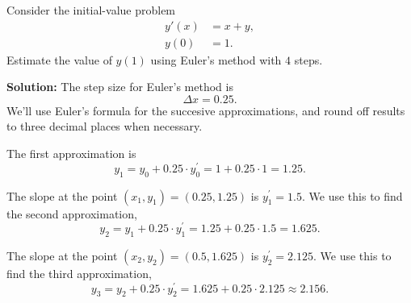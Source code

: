 \documentclass[11pt]{exam}
\begin{document}
\begin{questions}

\newpage
\addpoints
\question[4] Consider the initial-value problem
\begin{align*}
y'(x) & = x+y, \\
y(0) & = 1.
\end{align*}
Estimate the value of $y(1)$ using Euler's method with $4$ steps.  

\textbf{Solution:} The step size for Euler's method is 
\begin{equation*}
\Delta x = 0.25.
\end{equation*}
We'll use Euler's formula for the succesive approximations, and round off results to three decimal places when necessary.

The first approximation is 
\begin{equation*}
y_1=y_0+0.25 \cdot y^{'}_{0} = 1+0.25\cdot 1 = 1.25.
\end{equation*}

The slope at the point $(x_1,y_1)=(0.25, 1.25)$ is $y^{'}_{1}=1.5$. We use this to find the second approximation, 
\begin{equation*}
y_2=y_1+0.25 \cdot y^{'}_{1} = 1.25+0.25\cdot 1.5 = 1.625.
\end{equation*}

The slope at the point $(x_2,y_2)=(0.5, 1.625)$ is $y^{'}_{2}=2.125$. We use this to find the third approximation, 
\begin{equation*}
y_3=y_2+0.25 \cdot y^{'}_{2} = 1.625+0.25\cdot 2.125 \approx 2.156.
\end{equation*}


\end{questions}
\end{document}

